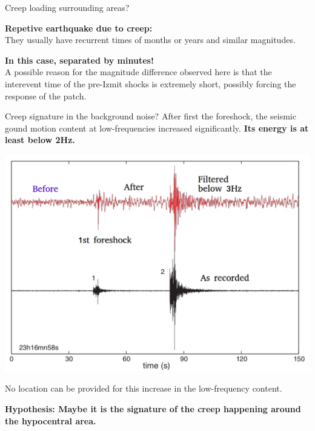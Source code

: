 \documentclass[aspectratio=43,9pt]{beamer}
\begin{document}
\begin{frame}{Creep loading surrounding areas?}

 {\bf Repetive earthquake due to creep:} \\
 \vskip 0.2cm
 They usually have recurrent times of months or years
 and similar magnitudes. \\
 \vskip 0.5cm

 {\bf In this case, separated by minutes!} \\
 \vskip 0.2cm
 A possible reason for the magnitude difference 
 observed here is that the interevent time of the 
 pre-Izmit shocks is extremely short, possibly forcing 
 the response of the patch.

  \vskip 0.4cm

 
\end{frame}

\begin{frame}{Creep signature in the background noise?}
 \vskip -0.4cm
 After first the foreshock, the seismic gound motion content 
 at low-frequencies increased significantly.  {\bf Its energy is at least below 2Hz.}
 \begin{center}
 \vskip -0.3cm
   \includegraphics[width=0.7\linewidth]{Figs/fig6.jpg}
 \end{center}
 \vskip -0.3cm
 No location can be provided for this increase in the low-frequency content.
 
 \begin{center}
  {\bf Hypothesis: Maybe it is the signature of the creep
  happening around the hypocentral area.}  
 \end{center}

\end{frame}
\end{document}
